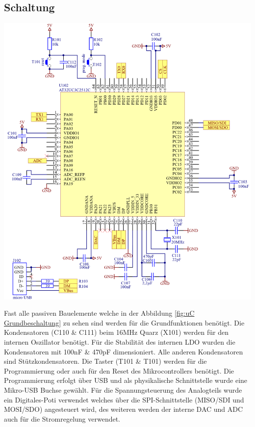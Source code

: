 \documentclass[paper=a4, 12pt]{scrreprt}
\begin{document}
		\subsection{Schaltung}
		\begin{adjustbox}{center,caption={Mikrocontroller Grundbeschaltung},label={fig:uC Grundbeschaltung},nofloat=figure,vspace=\bigskipamount}
			\includegraphics[width=\textwidth]{img/Grundbeschaltung_uC.PNG}
		\end{adjustbox}
	Fast alle passiven Bauelemente welche in der Abbildung \ref{fig:uC Grundbeschaltung} zu sehen sind werden für die Grundfunktionen benötigt. Die Kondensatoren (C110 \& C111) beim 16MHz Quarz (X101) werden für den internen Oszillator benötigt. Für die Stabilität des internen LDO wurden die Kondensatoren mit 100nF \& 470pF dimensioniert.
	Alle anderen Kondensatoren sind Stützkondensatoren. Die Taster (T101 \& T101) werden für die Programmierung oder auch für den Reset des Mikrocontrollers benötigt. Die Programmierung erfolgt über USB und als physikalische Schnittstelle wurde eine Mikro-USB Buchse gewählt. Für die Spannungsteuerung des Analogteils wurde ein Digitales-Poti verwendet welches über die SPI-Schnittstelle (MISO/SDI und MOSI/SDO) angesteuert wird, des weiteren werden der interne DAC und ADC auch für die Stromregelung verwendet.
\end{document}
